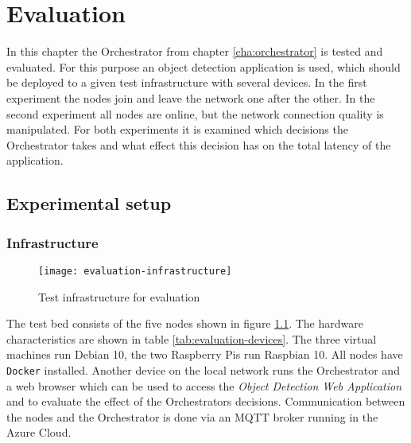 \chapter{Evaluation\label{cha:evaluation}}

In this chapter the Orchestrator from chapter \ref{cha:orchestrator} is tested and evaluated. For this purpose an object detection application is used, which should be deployed to a given test infrastructure with several devices. In the first experiment the nodes join and leave the network one after the other. In the second experiment all nodes are online, but the network connection quality is manipulated. For both experiments it is examined which decisions the Orchestrator takes and what effect this decision has on the total latency of the application.

\section{Experimental setup}

\subsection*{Infrastructure}

\begin{figure}[htb]
    \centering
    \texttt{[image: evaluation-infrastructure]}
    \caption{Test infrastructure for evaluation}
    \label{fig:evaluation-infrastructure}
\end{figure}

The test bed consists of the five nodes shown in figure \ref{fig:evaluation-infrastructure}. The hardware characteristics are shown in table \ref{tab:evaluation-devices}. The three virtual machines run Debian 10, the two Raspberry Pis run Raspbian 10. All nodes have \texttt{Docker} installed. Another device on the local network runs the Orchestrator and a web browser which can be used to access the \textit{Object Detection Web Application} and to evaluate the effect of the Orchestrators decisions. Communication between the nodes and the Orchestrator is done via an MQTT broker running in the Azure Cloud.

